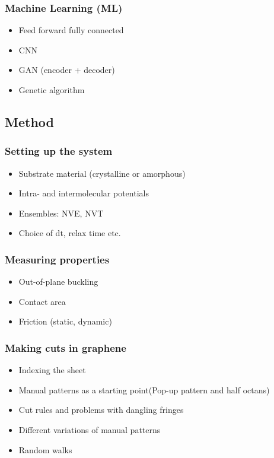\documentclass[UKenglish]{book}
\begin{document}
\subsubsection*{Machine Learning (ML)}
\begin{itemize}
  \item Feed forward fully connected
  \item CNN
  \item GAN (encoder + decoder)
  \item Genetic algorithm
\end{itemize}



\subsection*{Method}
\subsubsection*{Setting up the system}
\begin{itemize}
  \item Substrate material (crystalline or amorphous)
  \item Intra- and intermolecular potentials
  \item Ensembles: NVE, NVT
  \item Choice of dt, relax time etc.  
\end{itemize}
\subsubsection*{Measuring properties}
\begin{itemize}
  \item Out-of-plane buckling
  \item Contact area
  \item Friction (static, dynamic)
\end{itemize}


\subsubsection*{Making cuts in graphene}
\begin{itemize}
  \item Indexing the sheet
  \item  Manual patterns as a starting point(Pop-up pattern and half octans) 
  \item Cut rules and problems with dangling fringes
  \item Different variations of manual patterns 
  \item Random walks 
\end{itemize}
\end{document}
